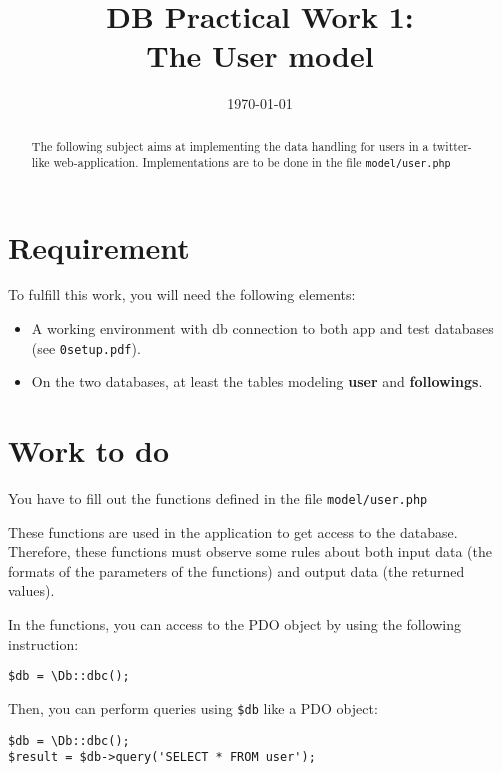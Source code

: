 \documentclass[twoside,a4paper,12pt]{article}
\title{DB Practical Work 1:\\The User model}
\date{\today}
\begin{document}
\maketitle

\begin{abstract}
  The following subject aims at implementing the data handling for users in a twitter-like web-application. Implementations are to be done in the file \texttt{model/user.php}
\end{abstract}

\tableofcontents

\clearpage

\section{Requirement}
To fulfill this work, you will need the following elements:

\begin{itemize}
\item A working environment with db connection to both app and test databases (see \texttt{0setup.pdf}).
\item On the two databases, at least the tables modeling \textbf{user} and \textbf{followings}.
\end{itemize}

\section{Work to do}
You have to fill out the functions defined in the file \texttt{model/user.php}

These functions are used in the application to get access to the database. Therefore, these functions must observe some rules about both input data (the formats of the parameters of the functions) and output data (the returned values).

In the functions, you can access to the PDO object by using the following instruction:

\begin{lstlisting}
$db = \Db::dbc();
\end{lstlisting}

Then, you can perform queries using \texttt{\$db} like a PDO object:
\begin{lstlisting}
$db = \Db::dbc();
$result = $db->query('SELECT * FROM user');
\end{lstlisting}
\end{document}
